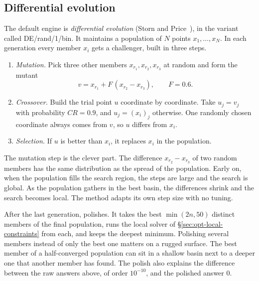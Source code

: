 \subsection{Differential evolution}

The default engine is \emph{differential evolution} (Storn and Price~\cite{stornprice}), in the variant called
DE/rand/1/bin. It maintains a population of \(N\) points
\(x_1, \dots, x_N\). In each generation every member \(x_i\) gets a challenger,
built in three steps.
\begin{enumerate}
\item \emph{Mutation.} Pick three other members \(x_{r_1}, x_{r_2}, x_{r_3}\) at
random and form the mutant
\[
  v = x_{r_1} + F\,(x_{r_2} - x_{r_3}), \qquad F = 0.6 .
\]
\item \emph{Crossover.} Build the trial point \(u\) coordinate by coordinate.
Take \(u_j = v_j\) with probability \(CR = 0.9\), and \(u_j = (x_i)_j\)
otherwise. One randomly chosen coordinate always comes from \(v\), so \(u\)
differs from \(x_i\).
\item \emph{Selection.} If \(u\) is better than \(x_i\), it replaces \(x_i\) in
the population.
\end{enumerate}

The mutation step is the clever part. The difference \(x_{r_2} - x_{r_3}\) of
two random members has the same distribution as the spread of the population.
Early on, when the population fills the search region, the steps are large and
the search is global. As the population gathers in the best basin, the
differences shrink and the search becomes local. The method adapts its own step
size with no tuning.


After the last generation,  polishes. It takes the best
\(\min(2n, 50)\) distinct members of the final population, runs the local
solver of \S\ref{sec:opt-local-constraints} from each, and keeps the deepest
minimum. Polishing several members instead of only the best one matters on a
rugged surface. The best member of a half-converged population can sit in a
shallow basin next to a deeper one that another member has found. The polish
also explains the difference between the raw answers above, of order
\(10^{-10}\), and the polished answer \(0\).


